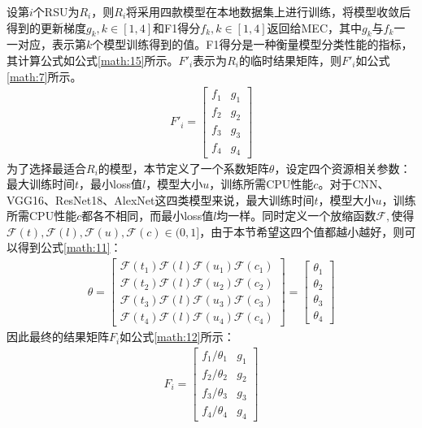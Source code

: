 设第$i$个RSU为$R_i$，则$R_i$将采用四款模型在本地数据集上进行训练，将模型收敛后得到的更新梯度$g_k,k\in[1,4]$和F1得分$f_k,k \in[1,4]$返回给MEC，其中$g_k$与$f_k$一一对应，表示第$k$个模型训练得到的值。F1得分是一种衡量模型分类性能的指标，其计算公式如公式\ref{math:15}所示。$F'_i$表示为$R_i$的临时结果矩阵，则$F'_i$如公式\ref{math:7}所示。
\begin{equation}
    \begin{aligned}
    F'_i=\begin{bmatrix} f_1 & g_1 \\ f_2 & g_2\\f_3 &  g_3 \\f_4 &  g_4 \end{bmatrix}
    \end{aligned}
    \label{math:7}
\end{equation}
为了选择最适合$R_i$的模型，本节定义了一个系数矩阵$\theta $，设定四个资源相关参数：最大训练时间$t$，最小loss值$l$，模型大小$u$，训练所需CPU性能$c$。对于CNN、VGG16、ResNet18、AlexNet这四类模型来说，最大训练时间$t$，模型大小$u$，训练所需CPU性能$c$都各不相同，而最小loss值$l$均一样。同时定义一个放缩函数$\mathcal{F}, $使得$\mathcal{F}(t),\mathcal{F}(l),\mathcal{F}(u),\mathcal{F}(c) \in (0,1]$，由于本节希望这四个值都越小越好，则可以得到公式\ref{math:11}：
\begin{equation}
    \begin{aligned}
    \theta =\begin{bmatrix}
     \mathcal{F}(t_1)\mathcal{F}(l)\mathcal{F}(u_1)\mathcal{F}(c_1) \\
     \mathcal{F}(t_2)\mathcal{F}(l)\mathcal{F}(u_2)\mathcal{F}(c_2) \\
     \mathcal{F}(t_3)\mathcal{F}(l)\mathcal{F}(u_3)\mathcal{F}(c_3) \\
     \mathcal{F}(t_4)\mathcal{F}(l)\mathcal{F}(u_4)\mathcal{F}(c_4) 
    \end{bmatrix}=\begin{bmatrix}
     \theta_1 \\ \theta_2 \\ \theta_3 \\  \theta_4
    \end{bmatrix}
    \end{aligned} 
    \label{math:11}
\end{equation}
因此最终的结果矩阵$F_i$如公式\ref{math:12}所示：
\begin{equation}
    \begin{aligned}
    F_i=\begin{bmatrix} f_1/\theta_1  & g_1 \\ f_2/\theta_2  & g_2\\f_3/\theta_3  &  g_3 \\f_4/\theta_4 &  g_4 \end{bmatrix}
    \end{aligned} \label{math:12}
\end{equation}

